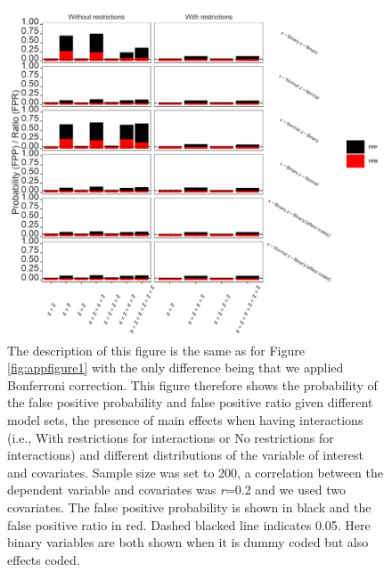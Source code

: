 \begin{figure}[hbt!]
\includegraphics[scale=0.95]{R/Analysis/Result/Figures/Figure1ASIBon.jpeg}
\centering
\caption{The description of this figure is the same as for Figure \ref{fig:appfigure1} with the only difference being that we applied Bonferroni correction. This figure therefore shows the probability of the false positive probability and false positive ratio given different model sets, the presence of main effects when having interactions (i.e., With restrictions for interactions or No restrictions for interactions) and different distributions of the variable of interest and covariates. Sample size was set to 200, a correlation between the dependent variable and covariates was \textit{r}=0.2 and we used two covariates. The false positive probability is shown in black and the false positive ratio in red. Dashed blacked line indicates 0.05. Here binary variables are both shown when it is dummy coded but also effects coded.}
\label{fig:appfigure7}
\end{figure}



